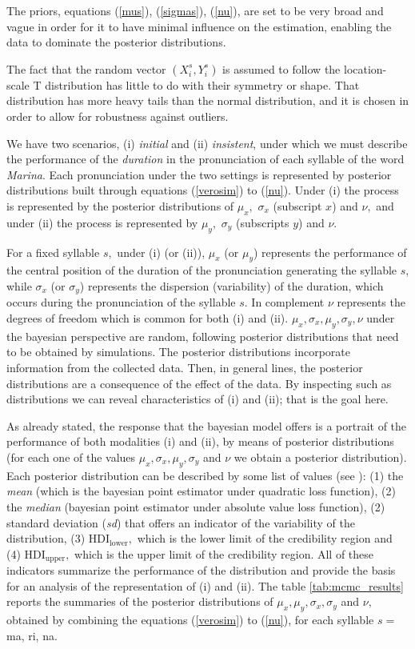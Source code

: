 \documentclass[11pt]{article}
\begin{document}
The priors, equations (\ref{mus}), (\ref{sigmas}), (\ref{nu}), are set to be very broad and vague in order for it to have minimal influence on the estimation, enabling the data to dominate the posterior distributions. 

The fact that the random vector $(X_i^s, Y_i^s)$ is assumed to follow the location-scale T distribution has little to do with their symmetry or shape. That distribution has more heavy tails than the normal distribution, and it is chosen in order to allow for robustness against outliers.

We have two scenarios, (i) {\it{initial}} and (ii) {\it{insistent}}, under which we must describe the performance of the {\it{duration}} in the pronunciation of each syllable of the word {\it{Marina}}. Each pronunciation under the two settings is represented by posterior distributions built through equations (\ref{verosim}) to (\ref{nu}). Under (i)  the process is represented by the posterior distributions of $\mu_x,$ $\sigma_x$ (subscript $x$) and $\nu,$ and under (ii) the process is represented by $\mu_y,$ $\sigma_y$ (subscripts $y$) and $\nu.$  

For a fixed syllable $s,$ under (i) (or (ii)), $\mu_x$ (or $\mu_y$) represents the performance of the central position of the duration of the pronunciation generating the syllable $s$, while $\sigma_x$ (or $\sigma_y$) represents the dispersion (variability) of the duration, which occurs during the pronunciation of the syllable $s$. In complement $\nu$ represents the degrees of freedom which is common for both (i) and (ii). $\mu_x, \sigma_x, \mu_y, \sigma_y, \nu$ under the bayesian perspective are random, following posterior distributions that need to be obtained by simulations. The posterior distributions incorporate information from the collected data. Then, in general lines, the posterior distributions are a consequence of the effect of the data. By inspecting such as distributions we can reveal characteristics of (i) and (ii); that is the goal here. 

As already stated, the response that the bayesian model offers is a portrait of the performance of both modalities (i) and (ii), by means of posterior distributions (for each one of the values $\mu_x, \sigma_x, \mu_y, \sigma_y$ and $\nu$ we obtain a posterior distribution). Each posterior distribution can be described by some list of values (see ): (1) the {\it{mean}} (which is the bayesian point estimator under quadratic loss function), (2) the {\it{median}} (bayesian point estimator under absolute value loss function), (2) standard deviation ({\it{sd}}) that offers an indicator of the variability of the distribution, (3) $\mbox{HDI}_{\mbox{lower}},$ which is the lower limit of the credibility region and (4) $\mbox{HDI}_{\mbox{upper}},$ which is the upper limit of the credibility region. All of these indicators summarize the performance of the distribution and provide the basis for an analysis of the representation of (i) and (ii).
 The table \ref{tab:mcmc_results} reports the summaries of the posterior distributions of $\mu_x, \mu_y, \sigma_x, \sigma_y$ and $\nu,$ obtained by combining the equations (\ref{verosim}) to (\ref{nu}), for each syllable $s=$ ma, ri, na.  
 
\end{document}
